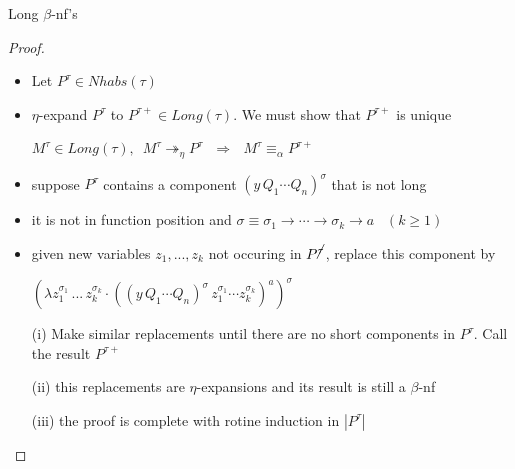 \begin{frame}{Long $\beta$-nf's}


\begin{proof}
 \begin{itemize}
  \item Let $P^{\tau} \in Nhabs(\tau)$
  \item $\eta$-expand $P^{\tau}$ to $P^{\tau +} \in Long(\tau)$. We must show that $P^{\tau +}$ is unique
  \begin{center}
   $M^{\tau} \in Long(\tau), \,\,\, M^{\tau}\twoheadrightarrow_{\eta} P^{\tau} \,\,\,\,\Longrightarrow \,\,\,\,M^{\tau} \equiv_{\alpha} P^{\tau +}$
  \end{center}
  \item suppose $P^{\tau}$ contains a component $(y\,Q_1\cdots Q_n)^{\sigma}$ that is not long
  \item it is not in function position and $\sigma \equiv \sigma_1 \to \cdots \to \sigma_k \to a\,\,\,\,\, (k \geq 1)$ 
  \item given new variables $z_1, ..., z_k$ not occuring in $P^{\cancel{\tau}}$, replace this component by
  \begin{center}
   $(\lambda z_1^{\sigma_1}\,...\, z_k^{\sigma_k} \cdot ((y\,Q_1\cdots Q_n)^{\sigma}\, z_1^{\sigma_1}\cdots z_k^{\sigma_k})^a)^{\sigma}$
  \end{center}
  \item[(i)] Make similar replacements until there are no short components in $P^{\tau}$. Call the result $P^{\tau +}$
  \item[(ii)] this replacements are $\eta$-expansions and its result is still a $\beta$-nf
  \item[(iii)] the proof is complete with rotine induction in $|P^{\tau}|$
 \end{itemize}
\end{proof}

\end{frame}

